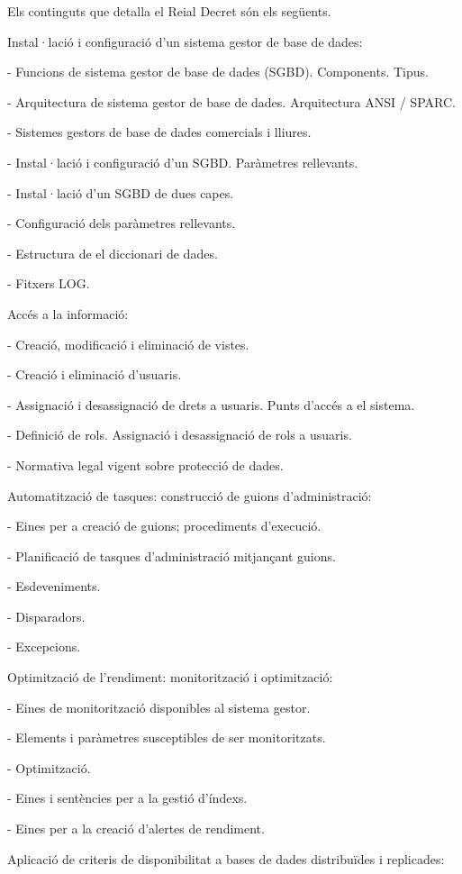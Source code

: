 \documentclass[catalan, a4paper, 12pt, titlepage]{article}
\begin{document}
Els continguts que detalla el Reial Decret són els següents.

Instal·lació i configuració d'un sistema gestor de base de dades:

- Funcions de sistema gestor de base de dades (SGBD). Components. Tipus.

- Arquitectura de sistema gestor de base de dades. Arquitectura ANSI / SPARC.

- Sistemes gestors de base de dades comercials i lliures.

- Instal·lació i configuració d'un SGBD. Paràmetres rellevants.

- Instal·lació d'un SGBD de dues capes.

- Configuració dels paràmetres rellevants.

- Estructura de el diccionari de dades.

- Fitxers LOG.

Accés a la informació:

- Creació, modificació i eliminació de vistes.

- Creació i eliminació d'usuaris.

- Assignació i desassignació de drets a usuaris. Punts d'accés a el sistema.

- Definició de rols. Assignació i desassignació de rols a usuaris.

- Normativa legal vigent sobre protecció de dades.

Automatització de tasques: construcció de guions d'administració:

- Eines per a creació de guions; procediments d'execució.

- Planificació de tasques d'administració mitjançant guions.

- Esdeveniments.

- Disparadors.

- Excepcions.

Optimització de l'rendiment: monitorització i optimització:

- Eines de monitorització disponibles al sistema gestor.

- Elements i paràmetres susceptibles de ser monitoritzats.

- Optimització.

- Eines i sentències per a la gestió d'índexs.

- Eines per a la creació d'alertes de rendiment.

Aplicació de criteris de disponibilitat a bases de dades distribuïdes i replicades:
\end{document}
